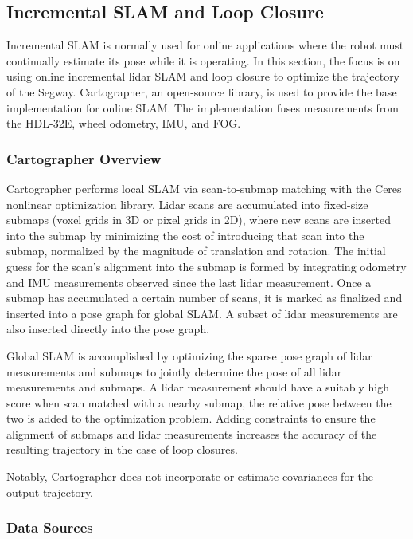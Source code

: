 \subsection{Incremental SLAM and Loop Closure}

Incremental SLAM is normally used for online applications where the robot must continually estimate its pose while it is operating. In this section, the focus is on using online incremental lidar SLAM and loop closure to optimize the trajectory of the Segway. Cartographer\cite{cartographer}, an open-source library, is used to provide the base implementation for online SLAM. The implementation fuses measurements from the HDL-32E, wheel odometry, IMU, and FOG.

\subsubsection{Cartographer Overview}

Cartographer performs local SLAM via scan-to-submap matching with the Ceres\cite{ceres} nonlinear optimization library. Lidar scans are accumulated into fixed-size submaps (voxel grids in 3D or pixel grids in 2D), where new scans are inserted into the submap by minimizing the cost of introducing that scan into the submap, normalized by the magnitude of translation and rotation. The initial guess for the scan's alignment into the submap is formed by integrating odometry and IMU measurements observed since the last lidar measurement. Once a submap has accumulated a certain number of scans, it is marked as finalized and inserted into a pose graph for global SLAM. A subset of lidar measurements are also inserted directly into the pose graph.

Global SLAM is accomplished by optimizing the sparse pose graph of lidar measurements and submaps to jointly determine the pose of all lidar measurements and submaps. A lidar measurement should have a suitably high score when scan matched with a nearby submap, the relative pose between the two is added to the optimization problem. Adding constraints to ensure the alignment of submaps and lidar measurements increases the accuracy of the resulting trajectory in the case of loop closures.

Notably, Cartographer does not incorporate or estimate covariances for the output trajectory.

\subsubsection{Data Sources}

